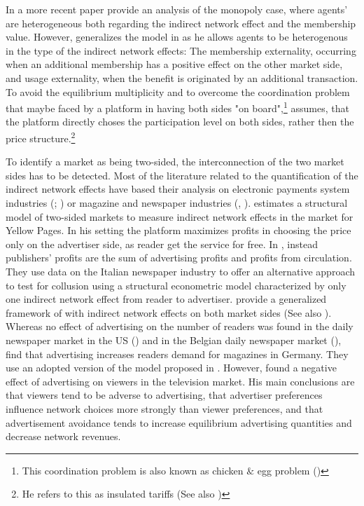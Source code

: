 \documentclass[10pt,a4paper]{scrreprt}
\begin{document}
In a more recent paper \cite{rochet_two-sided_2006} provide an analysis of the monopoly case, where agents' are heterogeneous both regarding the indirect network effect and the membership value. However, \cite{weyl_price_2010} generalizes the model in \cite{rochet_two-sided_2006} as he allows agents to be heterogenous in the type of the indirect network effects: The membership externality, occurring when an additional membership has a positive effect on the other market side, and usage externality, when the benefit is originated by an additional transaction. To avoid the equilibrium multiplicity and to overcome the coordination problem that maybe faced by a platform in having both sides "on board",\footnote{This coordination problem is also known as chicken $\&$ egg problem (\cite{caillaud_chicken_2003})} \cite{weyl_price_2010} assumes, that the platform directly choses the participation level on both sides, rather then the price structure.\footnote{He refers to this as insulated tariffs (See also \cite{white_insulated_2012})}

To identify a market as being two-sided, the interconnection of the two market sides has to be detected. Most of the literature related to the quantification of the indirect network effects have based their analysis on electronic payments system industries (\cite{ackerberg_quantifying_2006}; \cite{rysman_empirical_2007}) or magazine and newspaper industries (\cite{kaiser_price_2006}, \cite{argentesi_estimating_2007}). \cite{rysman_competition_2004} estimates a structural model of two-sided markets to measure indirect network effects in the market for Yellow Pages. In his setting the platform maximizes profits in choosing the price only on the advertiser side, as reader get the service for free. In \cite{argentesi_estimating_2007}, instead publishers’ profits are the sum of advertising profits and profits from circulation. They use data on the Italian newspaper industry to offer an alternative approach to test for collusion using a structural econometric model characterized by only one indirect network effect from reader to advertiser. \cite{argentesi_market_2005} provide a generalized framework of \cite{argentesi_estimating_2007} with indirect network effects on both market sides (See also \cite{filistrucchi_merger_2010}). Whereas no effect of advertising on the number of readers was found in the daily newspaper market in the US (\cite{fan_ownership_2013}) and in the Belgian daily newspaper market (\cite{cayseele_prices_2009}), \cite{kaiser_price_2006} find that advertising increases readers demand for magazines in Germany. They use an adopted version of the model proposed in \cite{armstrong_competition_2006}. However, \cite{wilbur_two-sided_2008} found a negative effect of advertising on viewers in the television market. His main conclusions are that viewers tend to be adverse to advertising, that advertiser preferences influence network choices more strongly than viewer preferences, and that advertisement avoidance tends to increase equilibrium advertising quantities and decrease network revenues.
\end{document}
